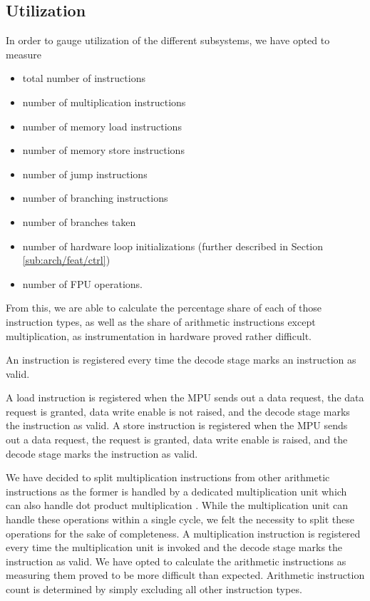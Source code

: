 \documentclass[../bachelor_paper.tex]{subfiles}
\begin{document}
\subsection{Utilization}
    \label{sub:arch/feat/ut}
In order to gauge utilization of the different subsystems, we have opted to measure 
\begin{itemize}
     \item total number of instructions
     \item number of multiplication instructions
     \item number of memory load instructions
     \item number of memory store instructions
     \item number of jump instructions
     \item number of branching instructions
     \item number of branches taken
     \item number of hardware loop initializations (further described in Section \ref{sub:arch/feat/ctrl})
     \item number of \ac{FPU} operations.
\end{itemize}
From this, we are able to calculate the percentage share of each of those instruction types, as well as the share of arithmetic instructions except multiplication, as instrumentation in hardware proved rather difficult.

An instruction is registered every time the decode stage marks an instruction as valid.

A load instruction is registered when the \ac{MPU} sends out a data request, the data request is granted, data write enable is not raised, and the decode stage marks the instruction as valid. A store instruction is registered when the \ac{MPU} sends out a data request, the request is granted, data write enable is raised, and the decode stage marks the instruction as valid.

We have decided to split multiplication instructions from other arithmetic instructions as the former is handled by a dedicated multiplication unit which can also handle dot product multiplication \cite{gautschiNearThresholdRISCVCore2017}. While the multiplication unit can handle these operations within a single cycle, we felt the necessity to split these operations for the sake of completeness. A multiplication instruction is registered every time the multiplication unit is invoked and the decode stage marks the instruction as valid. We have opted to calculate the arithmetic instructions as measuring them proved to be more difficult than expected. Arithmetic instruction count is determined by simply excluding all other instruction types.
\end{document}
